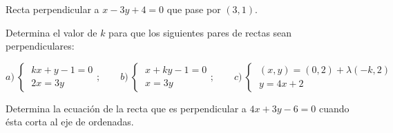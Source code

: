 \vspace{-8mm}
\begin{flushright}
\begin{footnotesize} \textcolor{gris}{}	\end{footnotesize}
\end{flushright}


\begin{mipropuesto}

Recta perpendicular a $x-3y+4=0$ que pase por $(3,1)$.

\end{mipropuesto}

\vspace{-8mm}
\begin{flushright}
\begin{footnotesize} \textcolor{gris}{}	\end{footnotesize}
\end{flushright}

\begin{mipropuesto}

Determina el valor de $k$ para que los siguientes pares de rectas sean perpendiculares:

\vspace{2mm} $a)\ \begin{cases} \ kx+y-1=0\\ \ 2x=3y \end{cases};\qquad
b)\ \begin{cases} \ x+ky-1=0 \\ \ x=3y \end{cases};\qquad
c)\ \begin{cases} \ (x,y)=(0,2)+\lambda(-k,2) \\ \ y=4x+2 \end{cases}$

\end{mipropuesto}

\vspace{-8mm}
\begin{flushright}
\begin{footnotesize} \textcolor{gris}{}	\end{footnotesize}
\end{flushright}

\begin{mipropuesto}

Determina la ecuación de la recta que es perpendicular a $4x+3y-6=0$ cuando ésta corta al eje de ordenadas.

\end{mipropuesto}

